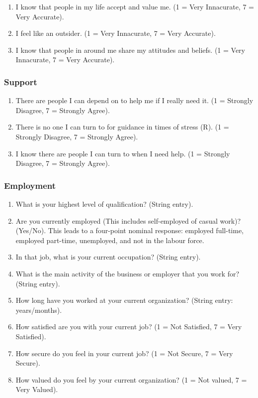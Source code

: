 \documentclass[
]{interact}
\providecommand{\tightlist}{%
  \setlength{\itemsep}{0pt}\setlength{\parskip}{0pt}}\usepackage{longtable,booktabs,array}
\begin{document}
\begin{enumerate}
\def\labelenumi{\arabic{enumi}.}
\tightlist
\item
  I know that people in my life accept and value me. (1 = Very
  Innacurate, 7 = Very Accurate).
\item
  I feel like an outsider. (1 = Very Innacurate, 7 = Very Accurate).
\item
  I know that people in around me share my attitudes and beliefs. (1 =
  Very Innacurate, 7 = Very Accurate).
\end{enumerate}

\subsubsection{Support}\label{support}

\begin{enumerate}
\def\labelenumi{\arabic{enumi}.}
\tightlist
\item
  There are people I can depend on to help me if I really need it. (1 =
  Strongly Disagree, 7 = Strongly Agree).
\item
  There is no one I can turn to for guidance in times of stress (R). (1
  = Strongly Disagree, 7 = Strongly Agree).
\item
  I know there are people I can turn to when I need help. (1 = Strongly
  Disagree, 7 = Strongly Agree).
\end{enumerate}

\subsubsection{Employment}\label{employment}

\begin{enumerate}
\def\labelenumi{\arabic{enumi}.}
\tightlist
\item
  What is your highest level of qualification? (String entry).
\item
  Are you currently employed (This includes self-employed of casual
  work)? (Yes/No). This leads to a four-point nominal response: employed
  full-time, employed part-time, unemployed, and not in the labour
  force.
\item
  In that job, what is your current occupation? (String entry).
\item
  What is the main activity of the business or employer that you work
  for? (String entry).
\item
  How long have you worked at your current organization? (String entry:
  years/months).
\item
  How satisfied are you with your current job? (1 = Not Satisfied, 7 =
  Very Satisfied).
\item
  How secure do you feel in your current job? (1 = Not Secure, 7 = Very
  Secure).
\item
  How valued do you feel by your current organization? (1 = Not valued,
  7 = Very Valued).
\end{enumerate}
\end{document}
